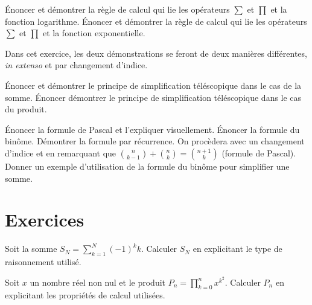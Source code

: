 \begin{exercise}[subtitle=Lien entre sommes et produits, extype=cours]
	\begin{tasks} 
		\task Énoncer et démontrer la règle de calcul qui lie les opérateurs $\sum$  et $\prod$  et la fonction logarithme. 
		\task Énoncer et démontrer la règle de calcul qui lie les opérateurs $\sum$  et $\prod$  et la fonction exponentielle.
	\end{tasks}
\end{exercise}


\begin{exercise}[subtitle=Simplication téléscopique, extype=cours]
	Dans cet exercice, les deux démonstrations se feront de deux manières différentes, \textit{in extenso} et par changement d'indice. 
	\begin{tasks} 
		\task Énoncer et démontrer le principe de simplification téléscopique dans le cas de la somme.
		\task  Énoncer démontrer le principe de simplification téléscopique dans le cas du produit. 
	\end{tasks}
\end{exercise}


\begin{exercise}[subtitle=Formule du binôme et preuve par récurrence, extype=cours]
	\begin{tasks} 
		\task Énoncer la formule de Pascal et l'expliquer visuellement.
		\task Énoncer la formule du binôme.
		\task Démontrer la formule par récurrence. On procèdera avec un changement d'indice et en remarquant que $\binom{n}{k-1} + \binom{n}{k}= \binom{n+1}{k}$ (formule de Pascal).
		\task Donner un exemple d'utilisation de la formule du binôme pour simplifier une somme. 
	\end{tasks}
\end{exercise}



\section{Exercices}

\begin{exercise}[subtitle= Somme et disjonction des cas, difficulty=**]
	Soit la somme $S_N = \sum\limits_{k=1}^{N}(-1)^k k$. Calculer $S_N$ en explicitant le type de raisonnement utilisé. 
\end{exercise}

\begin{exercise}[subtitle= Lien produit-somme, difficulty=*]
	Soit $x$ un nombre réel non nul et le produit $P_n = \prod\limits_{k=0}^{n}x^{k^2}$. Calculer $P_n$ en explicitant les propriétés de calcul utilisées. 
\end{exercise}

